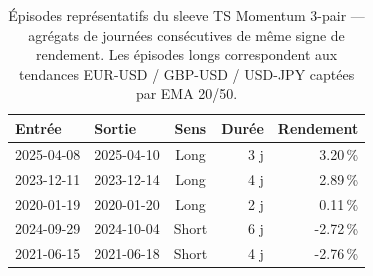\begin{table}[H]
\centering
\caption{Épisodes représentatifs du sleeve TS Momentum 3-pair — agrégats de journées consécutives de même signe de rendement. Les épisodes longs correspondent aux tendances EUR-USD / GBP-USD / USD-JPY captées par EMA 20/50.}
\label{tab:trades_ts_momentum}
\begin{tabular}{llcrr}
\toprule
Entrée & Sortie & Sens & Durée & Rendement \\
\midrule
2025-04-08 & 2025-04-10 & Long & 3 j & 3.20\,\% \\
2023-12-11 & 2023-12-14 & Long & 4 j & 2.89\,\% \\
2020-01-19 & 2020-01-20 & Long & 2 j & 0.11\,\% \\
2024-09-29 & 2024-10-04 & Short & 6 j & -2.72\,\% \\
2021-06-15 & 2021-06-18 & Short & 4 j & -2.76\,\% \\
\bottomrule
\end{tabular}
\end{table}
